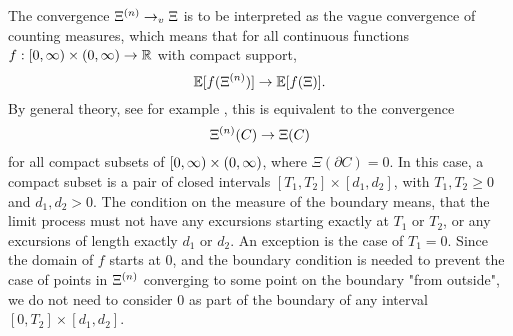 \begin{note}
	The convergence
	$\Xi^{(n)} \rightarrow_v \Xi$
	is to be interpreted as the vague convergence of counting measures,
	which means that for all continuous functions
	$f: [0, \infty) \times (0, \infty) \rightarrow \mathbb{R}$
	with compact support,
	\begin{equation}
		\mathbb{E}[f(\Xi^{(n)})] \rightarrow \mathbb{E}[f(\Xi)].
	\end{equation}
	By general theory,
	see for example \cite{Kallenberg1990},
	this is equivalent to the convergence
	\begin{equation}
	\Xi^{(n)}(C) \rightarrow \Xi(C)
	\end{equation}
	for all compact subsets of
	$[0, \infty) \times (0, \infty)$,
	where $\Xi(\partial C) = 0$.
	In this case, a compact subset is a pair of closed intervals
	$[T_1, T_2] \times [d_1, d_2]$,
	with $T_1, T_2 \geq 0$
	and $d_1, d_2 > 0$.
	The condition on the measure of the boundary means,
	that the limit process must not have any excursions starting exactly at
	$T_1$ or $T_2$,
	or any excursions of length exactly $d_1$ or $d_2$.
	An exception is the case of $T_1=0$.
	Since the domain of $f$ starts at $0$,
	and the boundary condition is needed to prevent the case of points in $\Xi^{(n)}$ converging to some point on the boundary "from outside",
	we do not need to consider $0$ as part of the boundary of any interval 
	$[0, T_2] \times [d_1, d_2]$.
\end{note}

